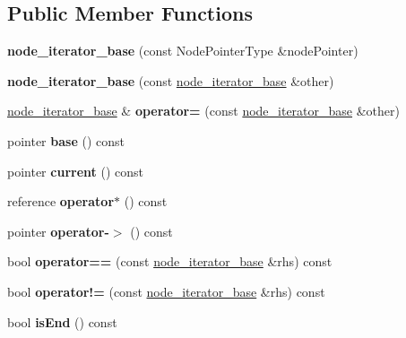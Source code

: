 \subsection*{Public Member Functions}
\begin{DoxyCompactItemize}
\item 
\mbox{\label{structnode__iterator__base_a7461830bb947f3eeb377b75f587d1c35}} 
{\bfseries node\+\_\+iterator\+\_\+base} (const Node\+Pointer\+Type \&node\+Pointer)
\item 
\mbox{\label{structnode__iterator__base_a92b6625c58a028dd30e0d4aa52b1daaa}} 
{\bfseries node\+\_\+iterator\+\_\+base} (const \mbox{\hyperlink{structnode__iterator__base}{node\+\_\+iterator\+\_\+base}} \&other)
\item 
\mbox{\label{structnode__iterator__base_abd4acf0445fa24590f3cc185ac279705}} 
\mbox{\hyperlink{structnode__iterator__base}{node\+\_\+iterator\+\_\+base}} \& {\bfseries operator=} (const \mbox{\hyperlink{structnode__iterator__base}{node\+\_\+iterator\+\_\+base}} \&other)
\item 
\mbox{\label{structnode__iterator__base_a10e77d7222d10041de0ee341befc8159}} 
pointer {\bfseries base} () const
\item 
\mbox{\label{structnode__iterator__base_a7edcc520aabaf9cdf4769f26db1c8be0}} 
pointer {\bfseries current} () const
\item 
\mbox{\label{structnode__iterator__base_a0a69a5d32704a4673c707abfabc820c7}} 
reference {\bfseries operator$\ast$} () const
\item 
\mbox{\label{structnode__iterator__base_aaedaabc6b6ac6e191f9e8777ed288914}} 
pointer {\bfseries operator-\/$>$} () const
\item 
\mbox{\label{structnode__iterator__base_aa580453a9b443455f2b9e2a22f9a3c8e}} 
bool {\bfseries operator==} (const \mbox{\hyperlink{structnode__iterator__base}{node\+\_\+iterator\+\_\+base}} \&rhs) const
\item 
\mbox{\label{structnode__iterator__base_ae740c1227819e0b1264f8e5bdaf5fb56}} 
bool {\bfseries operator!=} (const \mbox{\hyperlink{structnode__iterator__base}{node\+\_\+iterator\+\_\+base}} \&rhs) const
\item 
\mbox{\label{structnode__iterator__base_acc9e2aaef5c35f9c2fd9929308896513}} 
bool {\bfseries is\+End} () const
\end{DoxyCompactItemize}
